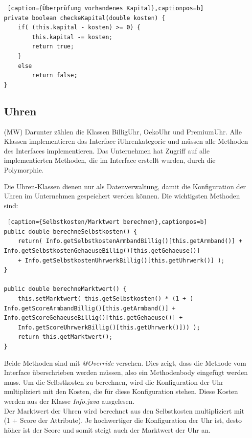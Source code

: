 \lstset{language=Java}
\begin{lstlisting} [caption={Überprüfung vorhandenes Kapital},captionpos=b]
private boolean checkeKapital(double kosten) {
	if( (this.kapital - kosten) >= 0) {
		this.kapital -= kosten;
		return true;
	}
	else
		return false;
}
\end{lstlisting}

\subsection{Uhren}
(MW) Darunter zählen die Klassen BilligUhr, OekoUhr und PremiumUhr. Alle Klassen implementieren das Interface iUhrenkategorie und müssen alle Methoden des Interfaces implementieren. Das Unternehmen hat Zugriff auf alle implementierten Methoden, die im Interface erstellt wurden, durch die Polymorphie. 

Die Uhren-Klassen dienen nur als Datenverwaltung, damit die Konfiguration der Uhren im Unternehmen gespeichert werden können. Die wichtigsten Methoden sind: 

\lstset{language=Java}
\begin{lstlisting} [caption={Selbstkosten/Marktwert berechnen},captionpos=b]
public double berechneSelbstkosten() {
	return( Info.getSelbstkostenArmbandBillig()[this.getArmband()] + Info.getSelbstkostenGehaeuseBillig()[this.getGehaeuse()] 
	+ Info.getSelbstkostenUhrwerkBillig()[this.getUhrwerk()] );
}

public double berechneMarktwert() {
	this.setMarktwert( this.getSelbstkosten() * (1 + ( Info.getScoreArmbandBillig()[this.getArmband()] + Info.getScoreGehaeuseBillig()[this.getGehaeuse()] + 
	Info.getScoreUhrwerkBillig()[this.getUhrwerk()])) ); 
	return this.getMarktwert();
}
\end{lstlisting}

Beide Methoden sind mit \textit{@Override} versehen. Dies zeigt, dass die Methode vom Interface überschrieben werden müssen, also ein Methodenbody eingefügt werden muss. Um die Selbstkosten zu berechnen, wird die Konfiguration der Uhr multipliziert mit den Kosten, die für diese Konfiguration stehen. Diese Kosten werden aus der Klasse \textit{Info.java} ausgelesen.\\

Der Marktwert der Uhren wird berechnet aus den Selbstkosten multipliziert mit (1 + Score der Attribute). Je hochwertiger die Konfiguration der Uhr ist, desto höher ist der Score und somit steigt auch der Marktwert der Uhr an.

